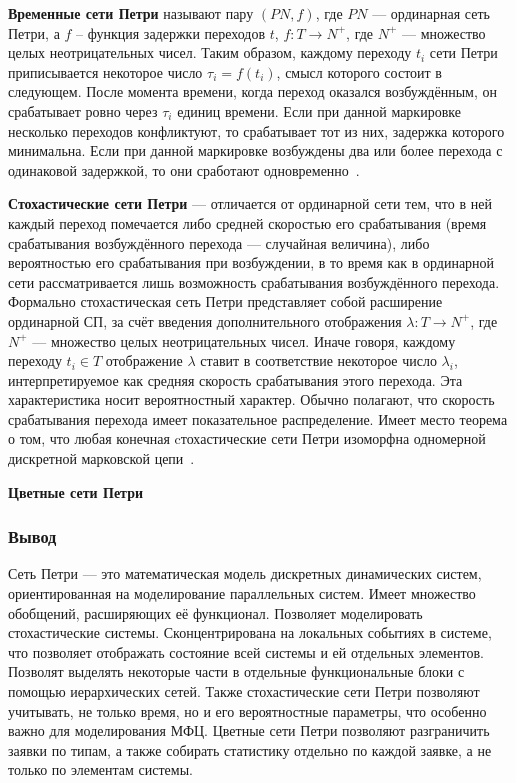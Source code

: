 \textbf{Временные сети Петри} называют пару $(PN, f)$, где $PN$ --- ординарная сеть Петри, а $f$ – функция задержки переходов $t$, $f : T \rightarrow N^+$, где $N^+$ --- множество целых неотрицательных чисел. Таким образом, каждому переходу $t_i$ сети Петри приписывается некоторое число $\tau_i = f(t_i)$, смысл которого состоит в следующем. После момента времени, когда переход оказался возбуждённым, он срабатывает ровно через $\tau_i$  единиц времени. Если при данной маркировке несколько переходов конфликтуют, то срабатывает тот из них, задержка которого минимальна. Если при данной маркировке возбуждены два или более перехода с одинаковой задержкой, то они сработают одновременно~\cite{timed_petri}.

\textbf{Стохастические сети Петри} --- отличается от ординарной сети тем, что в ней каждый переход помечается либо средней скоростью его срабатывания (время срабатывания возбуждённого перехода --- случайная величина), либо вероятностью его срабатывания при возбуждении, в то время как в ординарной сети рассматривается лишь возможность срабатывания возбуждённого перехода. Формально стохастическая сеть Петри представляет собой расширение ординарной СП, за счёт введения дополнительного отображения $\lambda : T \rightarrow N^+$, где $N^+$ --- множество целых неотрицательных чисел. Иначе говоря, каждому переходу $t_i \in T$ отображение $\lambda$ ставит в соответствие некоторое число $\lambda_i$, интерпретируемое как средняя скорость срабатывания этого перехода. Эта характеристика носит вероятностный характер. Обычно полагают, что скорость срабатывания перехода имеет показательное распределение. Имеет место теорема о том, что любая конечная cтохастические сети Петри изоморфна одномерной дискретной марковской цепи~\cite{timed_petri}.

\textbf{Цветные сети Петри}~\cite{cpn}

\subsubsection{Вывод}

Сеть Петри --- это математическая модель дискретных динамических систем, ориентированная на моделирование параллельных систем. Имеет множество обобщений, расширяющих её функционал. Позволяет моделировать стохастические системы. Сконцентрирована на локальных событиях в системе, что позволяет отображать состояние  всей системы и ей отдельных элементов. Позволят выделять некоторые части в отдельные функциональные блоки с помощью иерархических сетей. Также стохастические сети Петри позволяют учитывать, не только время, но и его вероятностные параметры, что особенно важно для моделирования МФЦ. Цветные сети Петри позволяют разграничить заявки по типам, а также собирать статистику отдельно по каждой заявке, а не только по элементам системы.

